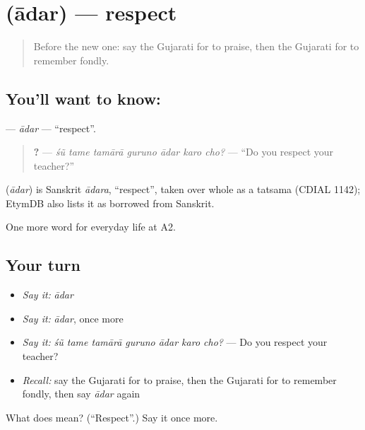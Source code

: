 \section[\texorpdfstring{\gu{આદર} (ādar)}{આદર (ādar)}]{ (ādar) — respect}

\label{lesson:GU-C269-adar}



\begin{quote}
Before the new one: say the Gujarati for to praise, then the Gujarati for to remember fondly.
\end{quote}

\subsection*{You'll want to know: }
\textbf{} — \emph{ādar} — \textquotedblleft{}respect\textquotedblright{}.

\begin{quote}
\textbf{      ?} — \emph{śũ tame tamārā guruno ādar karo cho?} — \textquotedblleft{}Do you respect your teacher?\textquotedblright{}
\end{quote}

\begin{cousinweb}
\textbf{} (\emph{ādar}) is Sanskrit \emph{ādara}, \textquotedblleft{}respect\textquotedblright{}, taken over whole as a tatsama (CDIAL 1142); EtymDB also lists it as borrowed from Sanskrit.
\end{cousinweb}

\begin{grammarlens}[title={What you've built}]
One more word for everyday life at A2.
\end{grammarlens}

\subsection*{Your turn}
\begin{itemize}
\raggedright
  \item \emph{Say it:} \emph{ādar}
  \item \emph{Say it:} \emph{ādar}, once more
  \item \emph{Say it:} \emph{śũ tame tamārā guruno ādar karo cho?} — Do you respect your teacher?
  \item \emph{Recall:} say the Gujarati for to praise, then the Gujarati for to remember fondly, then say \emph{ādar} again
\end{itemize}

\begin{tcolorbox}[breakable,colback=teal!4,colframe=teal!35!black,title={Before you move on}]
What does  mean? (\textquotedblleft{}Respect\textquotedblright{}.) Say it once more.
\end{tcolorbox}
